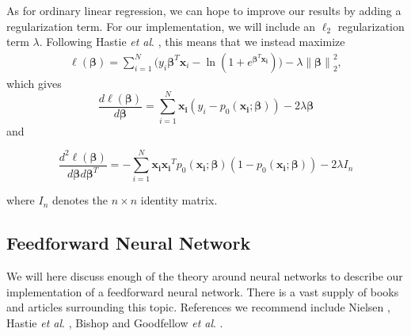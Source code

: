 \documentclass[aps,reprint,superscriptaddress,nofootinbib]{revtex4-2}
\newcommand{\norm}[1]{\left\lVert#1\right\rVert}
\begin{document}
As for ordinary linear regression, we can hope to improve our results by adding a regularization term. For our implementation, we will include an \(\ell_2\) regularization term \(\lambda\). Following Hastie \textit{et al}. \cite[section 4.4.4 and 11.5.2]{hastie}, this means that we instead maximize
\begin{align*}
    \ell(\bm{\beta})=\sum_{i=1}^N\Big(y_i\bm{\beta}^T\bm{x}_i - \ln(1 + e^{\bm{\beta}^T\bm{x_i}})\Big) - \lambda\norm{\bm{\beta}}_2^2,
\end{align*}
which gives
\begin{equation*}
    \frac{d\ell(\bm{\beta})}{d\bm{\beta}} = \sum_{i=1}^N\bm{x_i}(y_i - p_0(\bm{x_i};\bm{\beta})) - 2\lambda\bm{\beta}
\end{equation*}
and
\begin{small}
\begin{equation*}
    \frac{d^2\ell(\bm{\beta})}{d\bm{\beta}d\bm{\beta}^T} = -\sum_{i=1}^N\bm{x_i}\bm{x_i}^Tp_0(\bm{x_i};\bm{\beta})(1 - p_0(\bm{x_i};\bm{\beta})) - 2\lambda I_n
\end{equation*}
\end{small}
where \(I_n\) denotes the \(n\times n\) identity matrix.

\subsection*{Feedforward Neural Network}
    We will here discuss enough of the theory around neural networks to describe our implementation of a feedforward neural network. There is a vast supply of books and articles surrounding this topic. References we recommend include Nielsen \cite{nielsen}, Hastie \textit{et al}. \cite{hastie}, Bishop \cite{bishop2016pattern} and Goodfellow \textit{et al}. \cite{Goodfellow-et-al-2016}.
    
\end{document}
